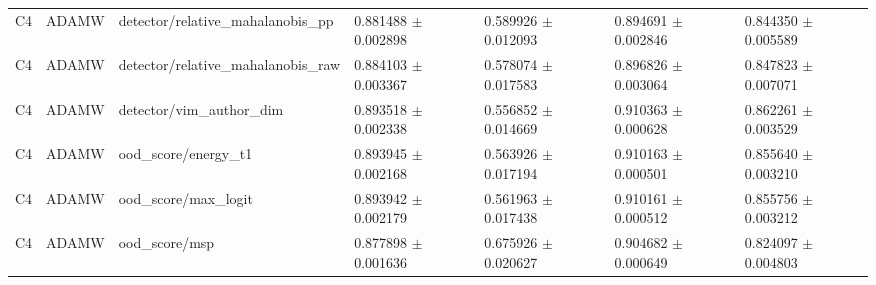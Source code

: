 \begin{longtable}{lllllll}
C4 & ADAMW & detector/relative\_mahalanobis\_pp & 0.881488 $\pm$ 0.002898 & 0.589926 $\pm$ 0.012093 & 0.894691 $\pm$ 0.002846 & 0.844350 $\pm$ 0.005589 \\
C4 & ADAMW & detector/relative\_mahalanobis\_raw & 0.884103 $\pm$ 0.003367 & 0.578074 $\pm$ 0.017583 & 0.896826 $\pm$ 0.003064 & 0.847823 $\pm$ 0.007071 \\
C4 & ADAMW & detector/vim\_author\_dim & 0.893518 $\pm$ 0.002338 & 0.556852 $\pm$ 0.014669 & 0.910363 $\pm$ 0.000628 & 0.862261 $\pm$ 0.003529 \\
C4 & ADAMW & ood\_score/energy\_t1 & 0.893945 $\pm$ 0.002168 & 0.563926 $\pm$ 0.017194 & 0.910163 $\pm$ 0.000501 & 0.855640 $\pm$ 0.003210 \\
C4 & ADAMW & ood\_score/max\_logit & 0.893942 $\pm$ 0.002179 & 0.561963 $\pm$ 0.017438 & 0.910161 $\pm$ 0.000512 & 0.855756 $\pm$ 0.003212 \\
C4 & ADAMW & ood\_score/msp & 0.877898 $\pm$ 0.001636 & 0.675926 $\pm$ 0.020627 & 0.904682 $\pm$ 0.000649 & 0.824097 $\pm$ 0.004803 \\
\end{longtable}
